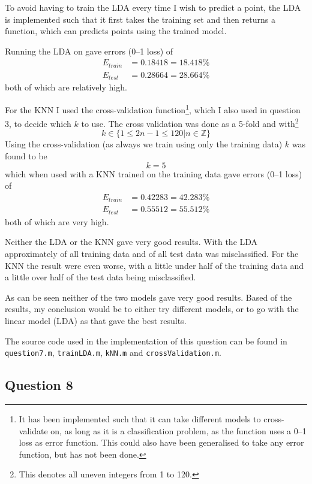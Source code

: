 \documentclass[a4paper, 11pt]{article}
\begin{document}
To avoid having to train the LDA every time I wish to predict a point, the LDA is implemented such that it first takes the training set and then returns a function, which can predicts points using the trained model.

Running the LDA on gave errors (0--1 loss) of
\begin{align*}
    E_{\mathit{train}} &= 0.18418 = 18.418 \% \\
    E_{\mathit{test}} &= 0.28664 = 28.664 \%
\end{align*}
both of which are relatively high.

For the KNN I used the cross-validation function\footnote{It has been implemented such that it can take different models to cross-validate on, as long as it is a classification problem, as the function uses a 0--1 loss as error function. This could also have been generalised to take any error function, but has not been done.}, which I also used in question 3, to decide which $k$ to use. The cross validation was done as a 5-fold and with\footnote{This denotes all uneven integers from 1 to 120.}
\[
k \in \lbrace 1 \le 2n-1 \le 120 | n \in \mathbb{Z} \rbrace
\]
Using the cross-validation (as always we train using only the training data) $k$ was found to be
\[
    k = 5
\]
which when used with a KNN trained on the training data gave errors (0--1 loss) of
\begin{align*}
    E_{\mathit{train}} &= 0.42283 = 42.283 \% \\
    E_{\mathit{test}} &= 0.55512 = 55.512 \%
\end{align*}
both of which are very high.

Neither the LDA or the KNN gave very good results. With the LDA approximately  of all training data and  of all test data was misclassified. For the KNN the result were even worse, with a little under half of the training data and a little over half of the test data being misclassified.

As can be seen neither of the two models gave very good results. Based of the results, my conclusion would be to either try different models, or to go with the linear model (LDA) as that gave the best results.

The source code used in the implementation of this question can be found in \texttt{question7.m}, \texttt{trainLDA.m}, \texttt{kNN.m} and \texttt{crossValidation.m}.

\subsection*{Question 8}
\end{document}
